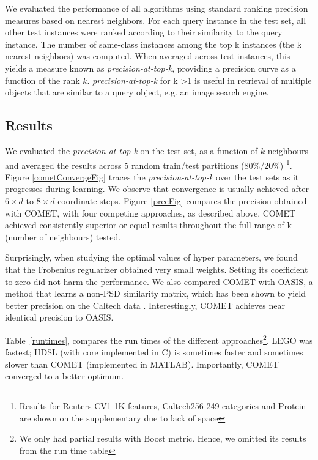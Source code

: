 \documentclass{article} %
\newcommand{\tabref}[1]{Table~\ref{#1}}
\begin{document}
We evaluated the performance of all algorithms using standard ranking precision measures based on nearest neighbors. For each query instance in the test set, all other test instances were ranked according to their similarity to the query instance. The number of same-class instances
among the top k instances (the k nearest neighbors) was computed. When averaged across test
instances, this yields a measure known as \textit{precision-at-top-k},
providing a precision curve as a function of the rank $k$. \textit{precision-at-top-k} for k >1 is useful in retrieval of multiple objects that are similar to a query object, e.g. an image search engine.
\subsection{Results}
We evaluated the \textit{precision-at-top-k} on the test set, as a function of $k$ neighbours and averaged the results across 5 random train/test partitions (80\%/20\%) \footnote{Results for Reuters CV1 1K features, Caltech256 249 categories and Protein are shown on the supplementary due to lack of space}.
Figure \ref{cometConvergeFig} traces the \textit{precision-at-top-k} over the test sets as it progresses during learning. We observe that convergence is usually achieved after $6\times d$ to $8 \times d$ coordinate steps.
Figure \ref{precFig} compares the precision obtained with COMET, with four competing approaches, as described above. COMET achieved consistently superior or equal results throughout the full range of k (number of neighbours) tested. 

Surprisingly, when studying the optimal values of hyper parameters, we found that the Frobenius regularizer obtained very small weights. Setting its coefficient to zero did not harm the performance. We also compared COMET with OASIS, a method that learns a non-PSD similarity matrix, which has been shown to yield better precision on the Caltech data \cite{OASIS}. Interestingly, COMET achieves near identical precision to OASIS. 

\tabref{runtimes}, compares the run times of the different approaches\footnote{We only had partial results with Boost metric. Hence, we omitted its results from the run time table}. LEGO was fastest; HDSL (with core implemented in C) is sometimes faster and sometimes slower than COMET (implemented in MATLAB). Importantly, COMET converged to a better optimum.
\end{document}

